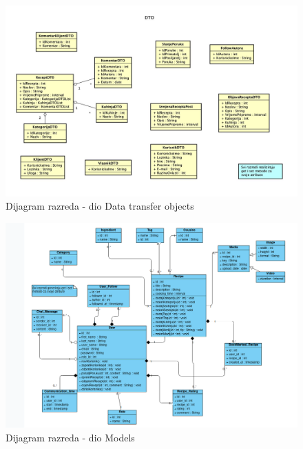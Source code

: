 		\eject

		\begin{figure}[H]
			\includegraphics[scale=0.32]{dijagrami/razdijag_dto.jpeg}
			\centering
			\caption{Dijagram razreda - dio Data transfer objects}
			\label{fig:bpdiag}
		\end{figure}

		\eject

		\begin{figure}[H]
			\includegraphics[scale=0.4]{dijagrami/razdijag_model.png}
			\centering
			\caption{Dijagram razreda - dio Models}
			\label{fig:bpdiag}
		\end{figure}